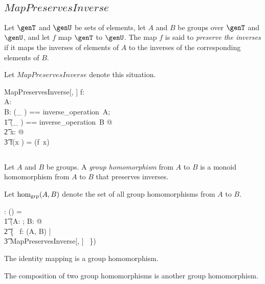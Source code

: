 \documentclass{amsart}
\begin{document}
\subsection{$MapPreservesInverse$}

Let $\genT$ and $\genU$ be sets of elements,
let $A$ and $B$ be groups over $\genT$ and $\genU$, 
and let $f$ map $\genT$ to $\genU$.
The map $f$ is said to {\em preserve the inverses} if it maps the inverses of elements of $A$
to the inverses of the corresponding elements of $B$.

Let $MapPreservesInverse$ denote this situation.

\begin{schema}{MapPreservesInverse}[\genT, \genU]
f: \genT \fun \genU \\
A: \group \genT \\
B: \group \genU
\where
\LET (\_ \invG) == inverse\_operation~A; \\
\t1	(\_ \daggerG) == inverse\_operation~B @ \\
\t2		\forall x: \genT @ \\
\t3			f(x \invG) = (f~x) \daggerG
\end{schema}

\subsection{}

Let $A$ and $B$ be groups.
A {\em group homomorphism} from $A$ to $B$ is a monoid homomorphism
from $A$ to $B$ that preserves inverses.

Let $\operatorname{hom_{grp}}(A, B)$ denote the set of all group homomorphisms from $A$ to $B$.

\begin{gendef}[\genT, \genU]
\homGroup: \group \genT \cross \group \genU \fun \power (\genT \fun \genU)
\where
\homGroup = \\
\t1	(\lambda A: \group \genT; B: \group \genU @ \\
\t2		\{~ f: \homMonoid(A, B) | \\
\t3			MapPreservesInverse[\genT, \genU] ~\})
\end{gendef}

\begin{remark}
The identity mapping is a group homomorphism.
\end{remark}

\begin{remark}
The composition of two group homomorphisms is another group homomorphism.
\end{remark}
\end{document}
